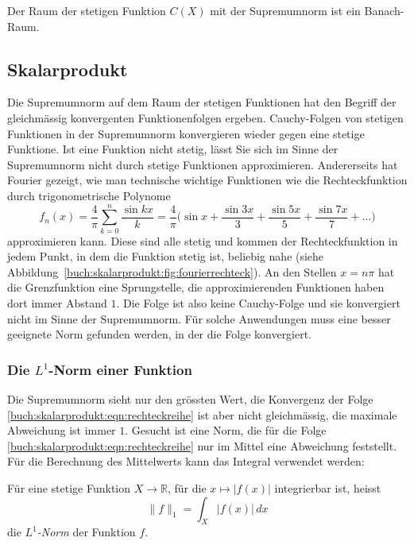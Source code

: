 \begin{satz}
Der Raum der stetigen Funktion $C(X)$ mit der Supremumnorm ist
ein Banach-Raum.
\end{satz}

%
%
\subsection{Skalarprodukt
\label{buch:skalarprodukt:subsection:skalarprodukt}}

Die Supremumnorm auf dem Raum der stetigen Funktionen hat den
Begriff der gleichmässig konvergenten Funktionenfolgen ergeben.
Cauchy-Folgen von stetigen Funktionen in der Supremumnorm konvergieren
wieder gegen eine stetige Funktione.
Ist eine Funktion nicht stetig, lässt Sie sich im Sinne der Supremumnorm
nicht durch stetige Funktionen approximieren.
Andererseits hat Fourier gezeigt, wie man technische wichtige Funktionen
wie die Rechteckfunktion durch trigonometrische Polynome
\begin{equation}
f_n(x)
=
\frac{4}{\pi} \sum_{k=0}^n \frac{\sin kx}{k}
=
\frac{4}{\pi} \biggl(
\sin x
+
\frac{\sin 3x}{3}
+
\frac{\sin 5x}{5}
+
\frac{\sin 7x}{7}
+
\ldots
\biggr)
\label{buch:skalarprodukt:eqn:rechteckreihe}
\end{equation}
approximieren kann.
Diese sind alle stetig und kommen der Rechteckfunktion in jedem Punkt,
in dem die Funktion stetig ist, beliebig nahe
(siehe Abbildung~\ref{buch:skalarprodukt:fig:fourierrechteck}).
An den Stellen $x = n\pi$ hat die Grenzfunktion eine Sprungstelle,
die approximierenden Funktionen haben dort immer Abstand $1$.
Die Folge ist also keine Cauchy-Folge und sie konvergiert nicht im
Sinne der Supremumnorm.
Für solche Anwendungen muss eine besser geeignete Norm gefunden werden,
in der die Folge konvergiert.

%
%
\subsubsection{Die $L^1$-Norm einer Funktion}
Die Supremumnorm sieht nur den grössten Wert, die Konvergenz der Folge
\eqref{buch:skalarprodukt:eqn:rechteckreihe} ist aber nicht gleichmässig,
die maximale Abweichung ist immer $1$.
Gesucht ist eine Norm, die für die Folge
\eqref{buch:skalarprodukt:eqn:rechteckreihe} 
nur im Mittel eine Abweichung feststellt.
Für die Berechnung des Mittelwerts kann das Integral verwendet werden:

\begin{definition}[$L^1$-Norm]
\label{buch:skalaprodukt:definition:l1norm}
Für eine stetige Funktion $X\to\mathbb{R}$, für die $x\mapsto |f(x)|$
integrierbar ist, heisst
\begin{equation}
\|f\|_1 = \int_X |f(x)|\,dx
\label{buch:skalarprodukt:eqn:l1norm}
\end{equation}
die {\em $L^1$-Norm} der Funktion $f$.
%
\end{definition}

